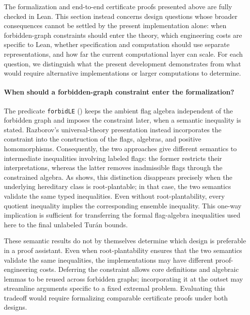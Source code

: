 \documentclass{article}
\newcommand{\lean}[1]{\texttt{#1}}
\begin{document}
The formalization and end-to-end certificate proofs presented above are fully
checked in Lean.  This section instead concerns design questions whose broader
consequences cannot be settled by the present implementation alone: when
forbidden-graph constraints should enter the theory, which engineering costs
are specific to Lean, whether specification and computation should use
separate representations, and how far the current computational layer can
scale.  For each question, we distinguish what the present development
demonstrates from what would require alternative implementations or larger
computations to determine.

\paragraph{When should a forbidden-graph constraint enter the formalization?}
The predicate \lean{forbidLE} () keeps the ambient flag
algebra independent of the forbidden graph and imposes the constraint later,
when a semantic inequality is stated.  Razborov's universal-theory
presentation instead incorporates the constraint into the construction of
the flags, algebras, and positive homomorphisms.  Consequently, the two
approaches give different semantics to intermediate inequalities involving
labeled flags: the former restricts their interpretations, whereas the latter
removes inadmissible flags through the constrained algebra.  As
 shows, this distinction disappears
precisely when the underlying hereditary class is root-plantable; in that
case, the two semantics validate the same typed inequalities.  Even without
root-plantability, every quotient inequality implies the corresponding
ensemble inequality.  This one-way implication is sufficient for
transferring the formal flag-algebra inequalities used here to the final
unlabeled Tur\'an bounds.

These semantic results do not by themselves determine which design is
preferable in a proof assistant.  Even when root-plantability ensures that the
two semantics validate the same inequalities, the implementations may have
different proof-engineering costs.  Deferring the constraint allows core
definitions and algebraic lemmas to be reused across forbidden graphs;
incorporating it at the outset may streamline arguments specific to a fixed
extremal problem.  Evaluating this tradeoff would require formalizing
comparable certificate proofs under both designs.
\end{document}
